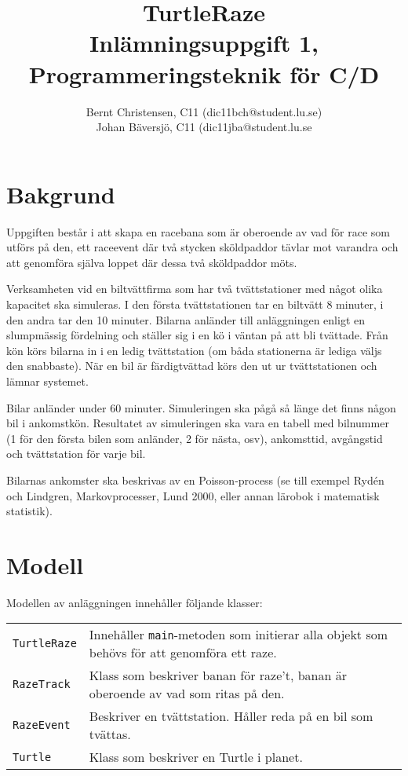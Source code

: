 \documentclass[a4paper]{article}
\title{TurtleRaze \\
	Inlämningsuppgift 1, Programmeringsteknik för C/D}
\author{Bernt Christensen, C11 (dic11bch@student.lu.se)\\
Johan Bäversjö, C11 (dic11jba@student.lu.se}
\newcommand{\code}[1]{\texttt{#1}} %
\begin{document}

\maketitle                    %

\section{Bakgrund}
Uppgiften består i att skapa en racebana som är oberoende av vad för race som utförs på den, ett raceevent där två stycken sköldpaddor tävlar mot varandra och att genomföra själva loppet där dessa två sköldpaddor möts.

Verksamheten vid en biltvättfirma som har två tvättstationer med något olika kapacitet ska simuleras. I den första tvättstationen tar en biltvätt 8 minuter, i den andra tar den 10 minuter. Bilarna anländer till anläggningen enligt en slumpmässig fördelning och ställer sig i en kö i väntan på att bli tvättade. Från kön körs bilarna in i en ledig tvättstation (om båda stationerna är lediga väljs den snabbaste). När en bil är färdigtvättad körs den ut ur tvättstationen och lämnar systemet. 


Bilar anländer under 60 minuter. Simuleringen ska pågå så länge det finns någon bil i ankomstkön. Resultatet av simuleringen ska vara en tabell med bilnummer (1 för den första bilen som anländer, 2 för nästa, osv), ankomsttid, avgångstid och tvättstation för varje bil.

Bilarnas ankomster ska beskrivas av en Poisson-process (se till exempel Rydén och Lindgren, Markovprocesser, Lund 2000, eller annan lärobok i matematisk statistik).


\section{Modell}
Modellen av anläggningen innehåller följande klasser:

\begin{tabular}{lp{8cm}}
\code{TurtleRaze} & Innehåller \code{main}-metoden som initierar alla objekt som behövs för att genomföra ett raze. \\
\code{RazeTrack} & Klass som beskriver banan för raze't, banan är oberoende av vad som ritas på den. \\
\code{RazeEvent} & Beskriver en tvättstation. Håller reda på en bil som tvättas. \\
\code{Turtle} & Klass som beskriver en Turtle i planet. \\
\end{tabular}
\end{document}
